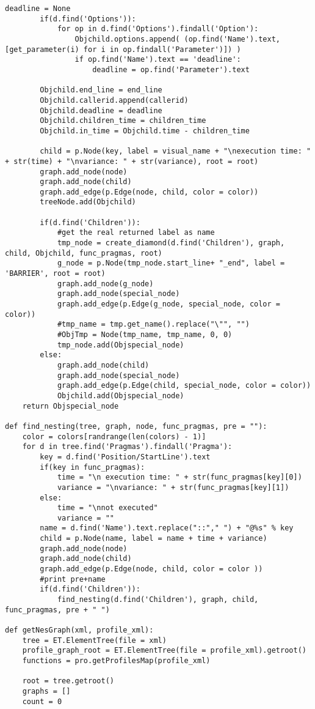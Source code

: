 \documentclass[a4paper,10pt,twoside]{book}
\begin{document}
\begin{lstlisting}[language=CCC, caption=pargraph.py]
		deadline = None
		if(d.find('Options')):
			for op in d.find('Options').findall('Option'):
				Objchild.options.append( (op.find('Name').text,[get_parameter(i) for i in op.findall('Parameter')]) )
				if op.find('Name').text == 'deadline':
					deadline = op.find('Parameter').text

		Objchild.end_line = end_line
		Objchild.callerid.append(callerid)
		Objchild.deadline = deadline
		Objchild.children_time = children_time
		Objchild.in_time = Objchild.time - children_time

		child = p.Node(key, label = visual_name + "\nexecution time: " + str(time) + "\nvariance: " + str(variance), root = root)
		graph.add_node(node)
		graph.add_node(child)
		graph.add_edge(p.Edge(node, child, color = color))
		treeNode.add(Objchild)

		if(d.find('Children')):
			#get the real returned label as name
			tmp_node = create_diamond(d.find('Children'), graph, child, Objchild, func_pragmas, root)
			g_node = p.Node(tmp_node.start_line+ "_end", label = 'BARRIER', root = root)
			graph.add_node(g_node)
			graph.add_node(special_node)
			graph.add_edge(p.Edge(g_node, special_node, color = color))
			#tmp_name = tmp.get_name().replace("\"", "") 
			#ObjTmp = Node(tmp_name, tmp_name, 0, 0)
			tmp_node.add(Objspecial_node)
		else:
			graph.add_node(child)
			graph.add_node(special_node)
			graph.add_edge(p.Edge(child, special_node, color = color))
			Objchild.add(Objspecial_node)
	return Objspecial_node

def find_nesting(tree, graph, node, func_pragmas, pre = ""):
	color = colors[randrange(len(colors) - 1)]
	for d in tree.find('Pragmas').findall('Pragma'):
		key = d.find('Position/StartLine').text
		if(key in func_pragmas):
			time = "\n execution time: " + str(func_pragmas[key][0])
			variance = "\nvariance: " + str(func_pragmas[key][1])
		else:
			time = "\nnot executed"
			variance = ""
		name = d.find('Name').text.replace("::"," ") + "@%s" % key
		child = p.Node(name, label = name + time + variance)
		graph.add_node(node)
		graph.add_node(child)
		graph.add_edge(p.Edge(node, child, color = color ))
		#print pre+name
		if(d.find('Children')):
			find_nesting(d.find('Children'), graph, child, func_pragmas, pre + " ")

def getNesGraph(xml, profile_xml):
	tree = ET.ElementTree(file = xml) 
	profile_graph_root = ET.ElementTree(file = profile_xml).getroot()
	functions = pro.getProfilesMap(profile_xml)

	root = tree.getroot()
	graphs = []
	count = 0


\end{lstlisting}
\end{document}
